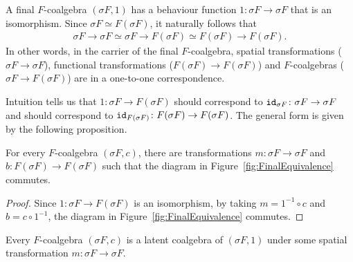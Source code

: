 A final $F$-coalgebra $(\sigma F, 1)$ has a behaviour function $1\colon \sigma F \rightarrow \sigma F$ that is an isomorphism. Since $\sigma F \simeq F(\sigma F)$, it naturally follows that 
\begin{align}
    \sigma F\rightarrow \sigma F \simeq \sigma F\rightarrow F(\sigma F) \simeq F(\sigma F)\rightarrow F(\sigma F).    
\end{align}
In other words, in the carrier of the final $F$-coalgebra, spatial transformations ($\sigma F\rightarrow \sigma F$), functional transformations ($F(\sigma F)\rightarrow F(\sigma F)$) and $F$-coalgebras ($\sigma F\rightarrow F(\sigma F)$) are in a one-to-one correspondence. 

Intuition tells us that $1\colon \sigma F \rightarrow F(\sigma F)$ should correspond to ${\texttt{id}}_{\sigma F}\colon \sigma F\rightarrow \sigma F$ and should correspond to ${\texttt{id}}_{F(\sigma F)}\colon F(\sigma F)\rightarrow F(\sigma F)$. The general form is given by the following proposition.
\begin{proposition}
    For every $F$-coalgebra $(\sigma F, c)$, there are transformations $m\colon \sigma F\rightarrow \sigma F$ and $b\colon F(\sigma F)\rightarrow F(\sigma F)$ such that the diagram in Figure~\ref{fig:FinalEquivalence} commutes.
\end{proposition}
\begin{proof}
    Since $1\colon \sigma F\rightarrow F(\sigma F)$ is an isomorphism, by taking $m=1^{-1}\circ c$ and $b=c\circ 1^{-1}$, the diagram in Figure~\ref{fig:FinalEquivalence} commutes.
\end{proof}
\begin{corollary}
    Every $F$-coalgebra $(\sigma F, c)$ is a latent coalgebra of $(\sigma F, 1)$ under some spatial transformation $m\colon \sigma F\rightarrow \sigma F$.
\end{corollary}

